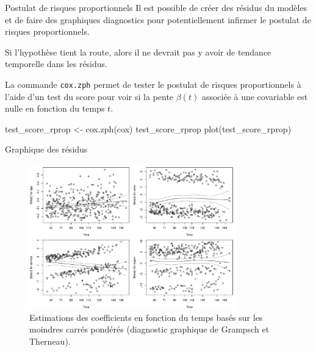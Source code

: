 \documentclass[
  ignorenonframetext,
]{beamer}
\newenvironment{Shaded}{\begin{snugshade}}{\end{snugshade}}
\newcommand{\FunctionTok}[1]{\textcolor[rgb]{0.28,0.35,0.67}{#1}}
\newcommand{\NormalTok}[1]{\textcolor[rgb]{0.00,0.23,0.31}{#1}}
\newcommand{\OtherTok}[1]{\textcolor[rgb]{0.00,0.23,0.31}{#1}}
\begin{document}
\begin{frame}[fragile]{Postulat de risques proportionnels}
\protect\hypertarget{postulat-de-risques-proportionnels}{}
Il est possible de créer des résidus du modèles et de faire des
graphiques diagnostics pour potentiellement infirmer le postulat de
risques proportionnels.

Si l'hypothèse tient la route, alors il ne devrait pas y avoir de
tendance temporelle dans les résidus.

La commande \texttt{cox.zph} permet de tester le postulat de risques
proportionnels à l'aide d'un test du score pour voir si la pente
\(\beta(t)\) associée à une covariable est nulle en fonction du temps
\(t\).

\begin{Shaded}
\begin{Highlighting}[numbers=left,,]
\NormalTok{test\_score\_rprop }\OtherTok{\textless{}{-}} \FunctionTok{cox.zph}\NormalTok{(cox)}
\NormalTok{test\_score\_rprop}
\FunctionTok{plot}\NormalTok{(test\_score\_rprop)}
\end{Highlighting}
\end{Shaded}
\end{frame}

\begin{frame}{Graphique des résidus}
\protect\hypertarget{graphique-des-ruxe9sidus}{}
\begin{figure}

{\centering \includegraphics[width=0.8\textwidth,height=\textheight]{MATH60602-diapos8_files/figure-beamer/fig-coxph-hypothese-1.pdf}

}

\caption{\label{fig-coxph-hypothese}Estimations des coefficients en
fonction du temps basés sur les moindres carrés pondérés (diagnostic
graphique de Grampsch et Therneau).}

\end{figure}
\end{frame}
\end{document}
